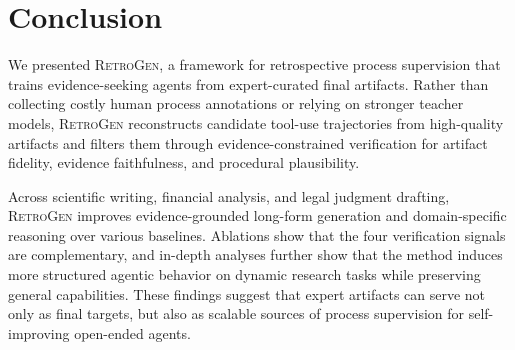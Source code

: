 \section{Conclusion}

We presented \textsc{RetroGen}, a framework for retrospective process supervision that trains evidence-seeking agents from expert-curated final artifacts. Rather than collecting costly human process annotations or relying on stronger teacher models, \textsc{RetroGen} reconstructs candidate tool-use trajectories from high-quality artifacts and filters them through evidence-constrained verification for artifact fidelity, evidence faithfulness, and procedural plausibility.

Across scientific writing, financial analysis, and legal judgment drafting, \textsc{RetroGen} improves evidence-grounded long-form generation and domain-specific reasoning over various baselines. Ablations show that the four verification signals are complementary, and in-depth analyses further show that the method induces more structured agentic behavior on dynamic research tasks while preserving general capabilities. These findings suggest that expert artifacts can serve not only as final targets, but also as scalable sources of process supervision for self-improving open-ended agents.